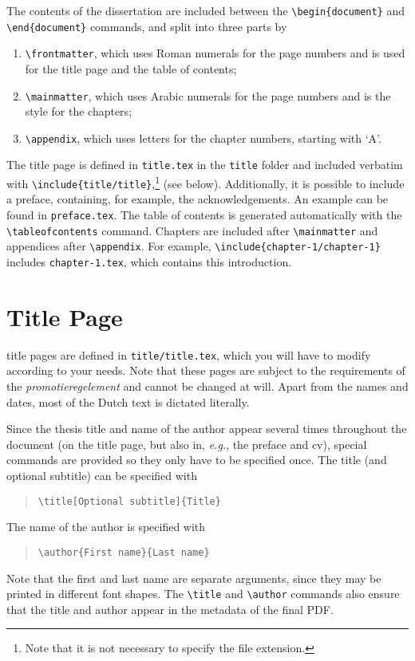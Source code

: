 The contents of the dissertation are included between the \texttt{\textbackslash begin\{document\}} and \texttt{\textbackslash end\{document\}} commands, and split into three parts by
\begin{enumerate}
\item\texttt{\textbackslash frontmatter}, which uses Roman numerals for the page numbers and is used for the title page and the table of contents;
\item\texttt{\textbackslash mainmatter}, which uses Arabic numerals for the page numbers and is the style for the chapters;
\item\texttt{\textbackslash appendix}, which uses letters for the chapter numbers, starting with `A'.
\end{enumerate}
The title page is defined in \texttt{title.tex} in the \texttt{title} folder and included verbatim with \texttt{\textbackslash include\{title/title\}},\footnote{Note that it is not necessary to specify the file extension.} (see below). Additionally, it is possible to include a preface, containing, for example, the acknowledgements. An example can be found in \texttt{preface.tex}. The table of contents is generated automatically with the \texttt{\textbackslash tableofcontents} command. Chapters are included after \texttt{\textbackslash mainmatter} and appendices after \texttt{\textbackslash appendix}. For example, \texttt{\textbackslash include\{chapter-1/chapter-1\}} includes \texttt{chapter-1.tex}, which contains this introduction.

\section{Title Page}

 title pages are defined in \texttt{title/title.tex}, which you will have to modify according to your needs. Note that these pages are subject to the requirements of the \emph{promotieregelement} and cannot be changed at will. Apart from the names and dates, most of the Dutch text is dictated literally.

Since the thesis title and name of the author appear several times throughout the document (on the title page, but also in, \emph{e.g.}, the preface and cv), special commands are provided so they only have to be specified once. The title (and optional subtitle) can be specified with

\begin{quote}
\texttt{\textbackslash title[Optional subtitle]\{Title\}}
\end{quote}
The name of the author is specified with
\begin{quote}
\texttt{\textbackslash author\{First name\}\{Last name\}}
\end{quote}
Note that the first and last name are separate arguments, since they may be printed in different font shapes. The \texttt{\textbackslash title} and \texttt{\textbackslash author} commands also ensure that the title and author appear in the metadata of the final PDF.

